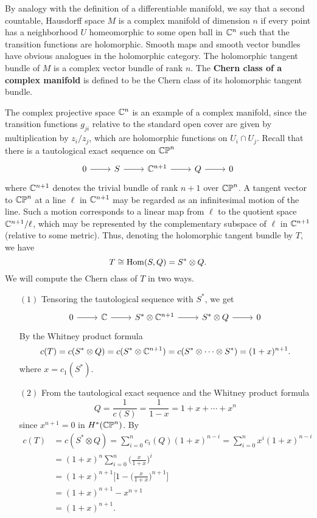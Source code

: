 \begin{example}\label{Chern class CP^n}
By analogy with the definition of a differentiable manifold, we say that a second countable, Hausdorff space $M$ is a complex manifold of dimension $n$ if every point 
has a neighborhood $U$ homeomorphic to some open ball in $\mathbb{C}^n$ such that the transition functions are holomorphic. Smooth maps and smooth vector bundles have obvious
analogues in the holomorphic category. The holomorphic tangent bundle of $M$ is a complex vector bundle of rank $n$. The \textbf{Chern class of a complex manifold} is defined 
to be the Chern class of its holomorphic tangent bundle.\par
The complex projective space $\mathbb{C}^n$ is an example of a complex manifold, since the transition functions $g_{ji}$ relative to the standard open cover are given by 
multiplication by $z_i/z_j$, which are holomorphic functions on $U_i\cap U_j$. Recall that there is a tautological exact sequence on $\mathbb{CP}^n$
\[\begin{tikzcd}
0\ar[r]&S\ar[r]&\C^{n+1}\ar[r]&Q\ar[r]&0
\end{tikzcd}\]
where $\mathbb{C}^{n+1}$ denotes the trivial bundle of rank $n+1$ over $\mathbb{CP}^n$. A tangent vector to $\mathbb{CP}^n$ at a line $\ell$ in $\mathbb{C}^{n+1}$ may be regarded as an infinitesimal 
motion of the line. Such a motion corresponds to a linear map from $\ell$ to the quotient space $\mathbb{C}^{n+1}/\ell$, which may be represented by the complementary subspace 
of $\ell$ in $\mathbb{C}^{n+1}$ (relative to some metric). Thus, denoting the holomorphic tangent bundle by $T$, we have
\[T\cong \mathrm{Hom}(S,Q)=S^*\otimes Q.\]
We will compute the Chern class of $T$ in two ways.
\begin{itemize}
\item[$(1)$] Tensoring the tautological sequence with $S^*$, we get
\[\begin{tikzcd}
0\ar[r]&\C\ar[r]&S^*\otimes\C^{n+1}\ar[r]&S^*\otimes Q\ar[r]&0
\end{tikzcd}\]
By the Whitney product formula
\[c(T)=c(S^*\otimes Q)=c(S^*\otimes\mathbb{C}^{n+1})=c(S^*\otimes\cdots\otimes S^*)=(1+x)^{n+1}.\]
where $x=c_1(S^*)$.
\item[$(2)$] From the tautological exact sequence and the Whitney product formula
\[Q=\frac{1}{c(S)}=\frac{1}{1-x}=1+x+\cdots+x^n\]
since $x^{n+1}=0$ in $H^*(\mathbb{CP}^n)$. By 
\begin{align*}
c(T)&=c(S^*\otimes Q)=\sum_{i=0}^{n}c_i(Q)(1+x)^{n-i}=\sum_{i=0}^{n}x^i(1+x)^{n-i}\\
&=(1+x)^n\sum_{i=0}^{n}\Big(\frac{x}{1+x})^{i}\\
&=(1+x)^{n+1}\Big[1-\Big(\frac{x}{1+x}\Big)^{n+1}\Big]\\
&=(1+x)^{n+1}-x^{n+1}\\
&=(1+x)^{n+1}.
\end{align*}
\end{itemize}
\end{example}
